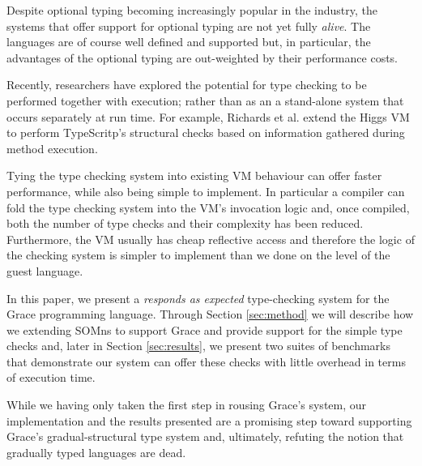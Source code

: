 Despite optional typing becoming increasingly popular in the industry, the systems that offer support for optional typing are not yet fully \emph{alive}. The languages are of course well defined and supported but, in particular, the advantages of the optional typing are out-weighted by their performance costs. 

Recently, researchers have explored the potential for type checking to be performed together with execution; rather than as an a stand-alone system that occurs separately at run time. For example, Richards et al. extend the Higgs VM to perform TypeScritp's structural checks based on information gathered during method execution. 

Tying the type checking system into existing VM behaviour can offer faster performance, while also being simple to implement. In particular a compiler can fold the type checking system into the VM's invocation logic and, once compiled, both the number of type checks and their complexity has been reduced. Furthermore, the VM usually has cheap reflective access and therefore the logic of the checking system is simpler to implement than we done on the level of the guest language.

In this paper, we present a \emph{responds as expected} type-checking system for the Grace programming language. Through Section \ref{sec:method} we will describe how we extending SOMns to support Grace and provide support for the simple type checks and, later in Section \ref{sec:results}, we present two suites of benchmarks that demonstrate our system can offer these checks with little overhead in terms of execution time.

While we having only taken the first step in rousing Grace's system, our implementation and the results presented are a promising step toward supporting Grace's gradual-structural type system and, ultimately, refuting the notion that gradually typed languages are dead.
